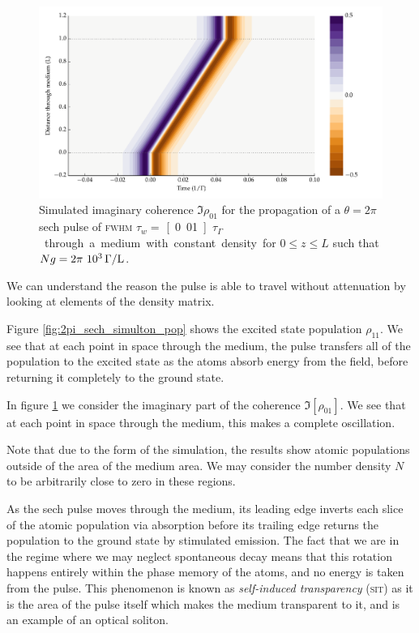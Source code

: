     \begin{figure}[]
      \includegraphics[width=\linewidth]
        {figs/03_nonlinear/coh_sech_2_0pi_fwhm0_010_Ng01000_fig3.pdf}
      \caption{
        Simulated imaginary coherence $\Im{\rho_{01}}$ for the propagation of a
        $\theta = 2\pi$ sech pulse of \textsc{fwhm} $\tau_w = $
        \unit[0.01]{$\tau_\Gamma$} through a medium with constant density for $0
        \le z \le L$ such that $Ng = \unit[2\pi~10^3]{\Gamma/L}$.
      }
      \label{fig:2pi_sech_simulton_coh}
    \end{figure}

    We can understand the reason the pulse is able to travel without attenuation
    by looking at elements of the density matrix. 

    Figure \ref{fig:2pi_sech_simulton_pop} shows the excited state population
    $\rho_{11}$. We see that at each point in space through the medium, the
    pulse transfers all of the population to the excited state as the atoms
    absorb energy from the field, before returning it completely to the ground
    state.

    In figure \ref{fig:2pi_sech_simulton_coh} we consider the imaginary part of
    the coherence $\Im\left[{\rho_{01}}\right]$. We see that at each point in space through
    the medium, this makes a complete oscillation.

    Note that due to the form of the simulation, the results show atomic
    populations outside of the area of the medium area. We may consider the
    number density $N$ to be arbitrarily close to zero in these regions.

    As the sech pulse moves through the medium, its leading edge inverts each
    slice of the atomic population via absorption before its trailing edge
    returns the population to the ground state by stimulated
    emission.\cite{Lamb1971} The fact that we are in the regime where we may
    neglect spontaneous decay means that this rotation happens entirely within
    the phase memory of the atoms, and no energy is taken from the pulse. This
    phenomenon is known as \textit{self-induced transparency} (\textsc{sit}) as
    it is the area of the pulse itself which makes the medium transparent to it,
    and is an example of an optical soliton\cite{kivshar2003optical}.

